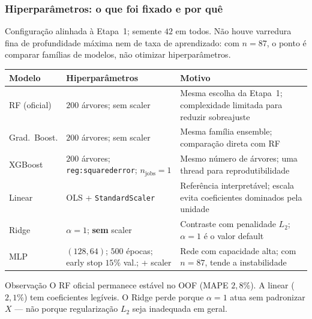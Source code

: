 \documentclass[aspectratio=169,10pt]{beamer}
\begin{document}
\begin{frame}[shrink=5]
  \frametitle{Hiperparâmetros: o que foi fixado e por quê}
  \scriptsize
  Configuração alinhada à Etapa~1; semente $42$ em todos.
  Não houve varredura fina de profundidade máxima nem de taxa de
  aprendizado: com $n=87$, o ponto é comparar famílias de modelos,
  não otimizar hiperparâmetros.
  \vspace{0.06cm}
  {\centering
  \setlength{\tabcolsep}{3pt}
  \begin{tabular}{llp{5.6cm}}
    \toprule
    Modelo & Hiperparâmetros & Motivo \\
    \midrule
    RF (oficial) &
    $200$ árvores; sem scaler &
    Mesma escolha da Etapa~1; complexidade limitada para reduzir sobreajuste \\
    Grad.\ Boost. &
    $200$ árvores; sem scaler &
    Mesma família ensemble; comparação direta com RF \\
    XGBoost &
    $200$ árvores;
    \texttt{reg:squarederror}; $n_{\mathrm{jobs}}=1$ &
    Mesmo número de árvores; uma thread para reprodutibilidade \\
    Linear &
    OLS + \texttt{StandardScaler} &
    Referência interpretável; escala evita coeficientes dominados pela unidade \\
    Ridge &
    $\alpha=1$; \textbf{sem} scaler &
    Contraste com penalidade $L_2$; $\alpha=1$ é o valor default \\
    MLP &
    $(128,64)$;
    $500$ épocas; early stop $15\%$ val.;
    + scaler &
    Rede com capacidade alta; com $n=87$, tende a instabilidade \\
    \bottomrule
  \end{tabular}
  \par}
  \vspace{0.08cm}
  \begin{exampleblock}{Observação}
    \scriptsize
    O RF oficial permanece estável no OOF (MAPE $2{,}8\%$).
    A linear ($2{,}1\%$) tem coeficientes legíveis.
    O Ridge perde porque $\alpha=1$ atua sem padronizar $X$ ---
    não porque regularização $L_2$ seja inadequada em geral.
  \end{exampleblock}
\end{frame}
\end{document}
